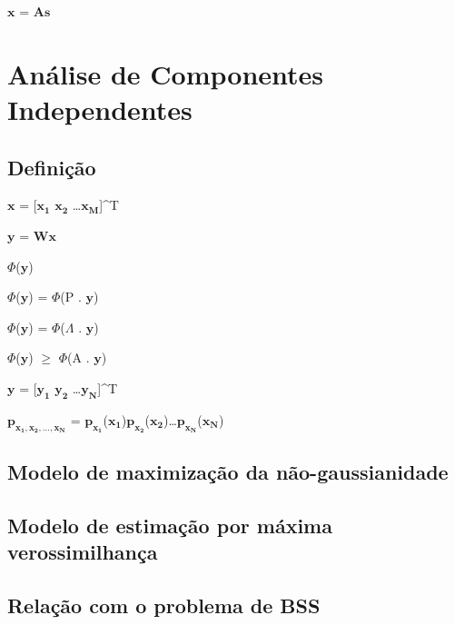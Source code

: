 $\mathbf{x}$ = $\mathbf{A}$$\mathbf{s}$

\section{Análise de Componentes Independentes}
\subsection{Definição}

$\mathbf{x}$ = [$\mathbf{x_1}$ $\mathbf{x_2}$ \dots  $\mathbf{x_M}$]^T

$\mathbf{y}$ = $\mathbf{W}$$\mathbf{x}$

$\Phi$($\mathbf{y}$) 

$\Phi$($\mathbf{y}$) = $\Phi$(P . $\mathbf{y}$)

$\Phi$($\mathbf{y}$) = $\Phi$($\Lambda$ . $\mathbf{y}$)

% 
$\Phi$($\mathbf{y}$) $\geq$  $\Phi$(A . $\mathbf{y}$)


$\mathbf{y}$ = [$\mathbf{y_1}$ $\mathbf{y_2}$ \dots  $\mathbf{y_N}$]^T

$\mathbf{p_{x_1,x_2,\dots,x_N}}$ = $\mathbf{p_{x_1}}$($\mathbf{x_1}$)$\mathbf{p_{x_2}}$($\mathbf{x_2}$)\dots$\mathbf{p_{x_N}}$($\mathbf{x_N}$)

\subsection{Modelo de maximização da não-gaussianidade}
\subsection{Modelo de estimação por máxima verossimilhança}
\subsection{Relação com o problema de BSS}

